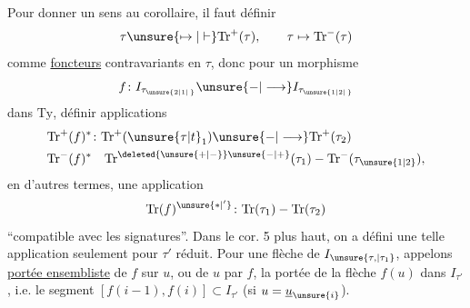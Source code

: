 Pour donner un sens au corollaire, il
faut définir 
\[
 \tau\unsure{\mapsto|\mathrel{\vdash}}\mathrm{Tr}^{+}(\tau),\qquad \tau\mapsto\mathrm{Tr}^{-}(\tau)
\]
comme \uline{foncteurs} contravariants en $\tau$, donc
pour un morphisme
\[
 f\colon I_{\tau_{\unsure{2|1|\,}}}\unsure{\mathbin{-}|\longrightarrow}I_{\tau_{\unsure{1|2|\,}}}
\]
dans $\mathrm{Ty}$, définir  applications
\[
\begin{aligned}
\mathrm{Tr}^+(f)^*&\colon\mathrm{Tr}^+(\unsure{\tau|t}_1)\unsure{\mathbin{-}|\longrightarrow}\mathrm{Tr}^+(\tau_2)\\
\mathrm{Tr}^-(f)^*&\quad\mathrm{Tr}^{\deleted{\unsure{+|-}}\unsure{-|+}}(\tau_1)\mathbin{-}\mathrm{Tr}^-(\tau_{\unsure{1|2}}),
\end{aligned}
\]
en d'autres termes, une application
\[
 \mathrm{Tr}(f)^{\unsure{*|'}}\colon\mathrm{Tr}(\tau_1)\mathbin{-}\mathrm{Tr}(\tau_2)
\]
``compatible avec les signatures''. Dans le cor. 5
plus haut, on a défini une telle application seulement pour $\tau'$ réduit.
Pour une flèche 
de $I_{\unsure{\tau,|\tau_1}}$,  appelons \uline{portée ensembliste} de
$f$ sur $u$, ou de $u$ par $f$, la portée  de
la flèche $f(u)$ dans $I_{\tau'}$, i.e. 
le segment $[f(i-1),f(i)]\subset I_{\tau'}$ (si $u=\underline{u}_{\unsure{i}}$).

